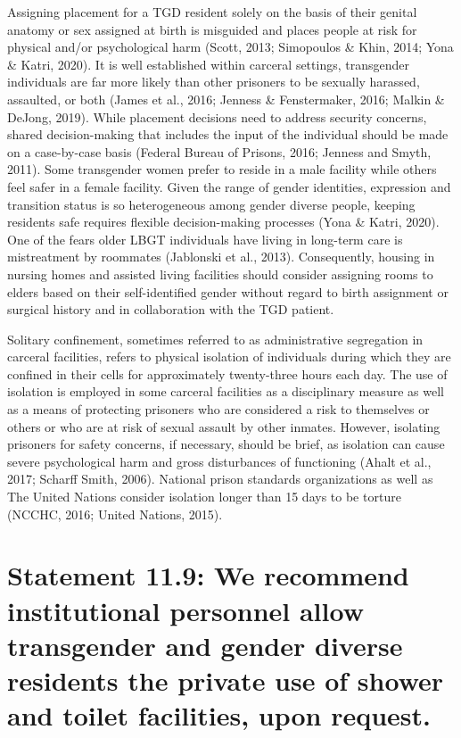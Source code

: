 \documentclass[
]{book}
\begin{document}
Assigning placement for a TGD resident solely
on the basis of their genital anatomy or sex
assigned at birth is misguided and places people
at risk for physical and/or psychological harm
(Scott, 2013; Simopoulos \& Khin, 2014; Yona \&
Katri, 2020). It is well established within carceral
settings, transgender individuals are far more
likely than other prisoners to be sexually harassed,
assaulted, or both (James et al., 2016; Jenness \&
Fenstermaker, 2016; Malkin \& DeJong, 2019).
While placement decisions need to address security concerns, shared decision-making that
includes the input of the individual should be
made on a case-by-case basis (Federal Bureau of
Prisons, 2016; Jenness and Smyth, 2011). Some
transgender women prefer to reside in a male
facility while others feel safer in a female facility.
Given the range of gender identities, expression
and transition status is so heterogeneous among
gender diverse people, keeping residents safe
requires flexible decision-making processes (Yona
\& Katri, 2020). One of the fears older LBGT
individuals have living in long-term care is mistreatment by roommates (Jablonski et al., 2013).
Consequently, housing in nursing homes and
assisted living facilities should consider assigning
rooms to elders based on their self-identified
gender without regard to birth assignment or
surgical history and in collaboration with the
TGD patient.

Solitary confinement, sometimes referred to as
administrative segregation in carceral facilities,
refers to physical isolation of individuals during
which they are confined in their cells for approximately twenty-three hours each day. The use of
isolation is employed in some carceral facilities
as a disciplinary measure as well as a means of
protecting prisoners who are considered a risk
to themselves or others or who are at risk of
sexual assault by other inmates. However, isolating prisoners for safety concerns, if necessary,
should be brief, as isolation can cause severe
psychological harm and gross disturbances of
functioning (Ahalt et al., 2017; Scharff Smith,
2006). National prison standards organizations as
well as The United Nations consider isolation
longer than 15 days to be torture (NCCHC, 2016;
United Nations, 2015).

\hypertarget{statement-11.9-we-recommend-institutional-personnel-allow-transgender-and-gender-diverse-residents-the-private-use-of-shower-and-toilet-facilities-upon-request.}{%
\section*{Statement 11.9: We recommend institutional personnel allow transgender and gender diverse residents the private use of shower and toilet facilities, upon request.}\label{statement-11.9-we-recommend-institutional-personnel-allow-transgender-and-gender-diverse-residents-the-private-use-of-shower-and-toilet-facilities-upon-request.}}
\end{document}
